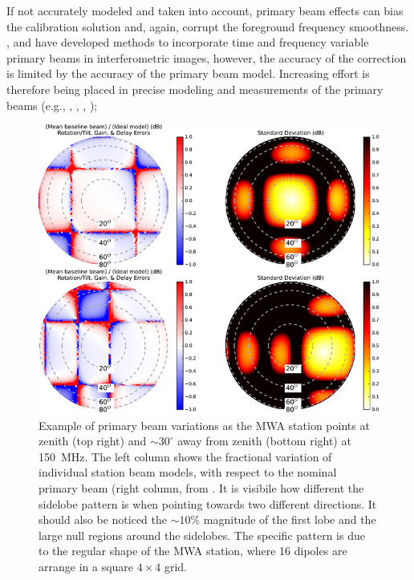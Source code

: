 \begin{itemize}
If not accurately modeled and taken into account, primary beam effects can bias the calibration solution and, again, corrupt the foreground frequency smoothness.  \cite{bhatnagar08}, \cite{sullivan12} and \cite{tasse13} have developed methods to incorporate time and frequency variable primary beams in interferometric images, however, the accuracy of the correction is limited by the accuracy of the primary beam model. Increasing effort is therefore being placed in precise modeling and measurements of the  primary beams (e.g., \cite{pupillo15}, \cite{deleraacedo17}, \cite{jacobs17}, \cite{deleraacedo18});
\begin{figure}[]
\begin{center}
\includegraphics[width=1.\textwidth]{Bernardi/mwa_beams_err}
\end{center}
\caption{Example of primary beam variations as the MWA station points at zenith (top right) and $\sim 30^\circ$ away from zenith (bottom right) at 150~MHz. The left column shows the fractional variation of individual station beam models, with respect to the nominal primary beam (right column, from \cite{neben16}. It is visibile how different the sidelobe pattern is when pointing towards two different directions. It should also be noticed the $\sim 10\%$ magnitude of the first lobe and the large null regions around the sidelobes. The specific pattern is due to the regular shape of the MWA station, where 16 dipoles are arrange in a square $4 \times 4$ grid.}
\label{fig:fig3}
\end{figure}



\end{itemize}

